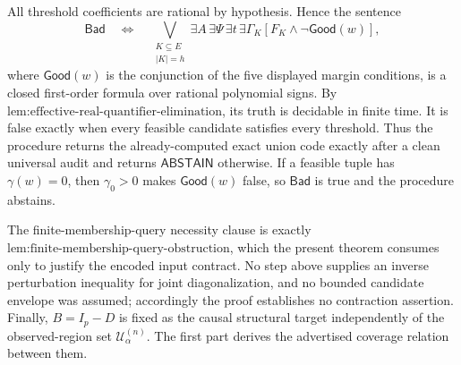 All threshold coefficients are rational by hypothesis. Hence the sentence
\[
\mathsf{Bad}
\quad\Longleftrightarrow\quad
\bigvee_{\substack{K\subseteq E\\|K|=h}}
\exists A\,\exists\Psi\,\exists t\,\exists\Gamma_K
\left[F_K\wedge\neg\mathsf{Good}(w)
\right],
\]
where \(\mathsf{Good}(w)\) is the conjunction of the five displayed margin conditions, is a closed first-order formula over rational polynomial signs. By \(\text{lem:effective-real-quantifier-elimination}\), its truth is decidable in finite time. It is false exactly when every feasible candidate satisfies every threshold. Thus the procedure returns the already-computed exact union code exactly after a clean universal audit and returns \(\mathsf{ABSTAIN}\) otherwise. If a feasible tuple has \(\gamma(w)=0\), then \(\gamma_0>0\) makes \(\mathsf{Good}(w)\) false, so \(\mathsf{Bad}\) is true and the procedure abstains.

The finite-membership-query necessity clause is exactly \(\text{lem:finite-membership-query-obstruction}\), which the present theorem consumes only to justify the encoded input contract. No step above supplies an inverse perturbation inequality for joint diagonalization, and no bounded candidate envelope was assumed; accordingly the proof establishes no contraction assertion. Finally, \(B=I_p-D\) is fixed as the causal structural target independently of the observed-region set \(\mathcal U^{(n)}_\alpha\). The first part derives the advertised coverage relation between them.